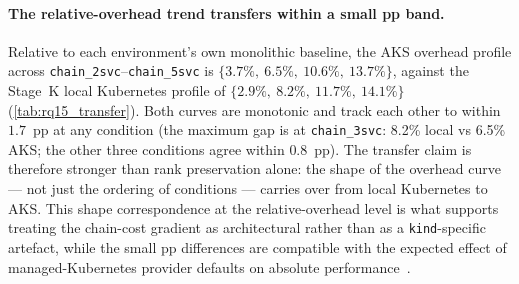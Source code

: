 \paragraph{The relative-overhead trend transfers within a small pp band.}
Relative to each environment's own monolithic baseline, the AKS overhead
profile across \texttt{chain\_2svc}--\texttt{chain\_5svc} is
$\{3.7\%,\ 6.5\%,\ 10.6\%,\ 13.7\%\}$, against the Stage~K local
Kubernetes profile of $\{2.9\%,\ 8.2\%,\ 11.7\%,\ 14.1\%\}$
(\cref{tab:rq15_transfer}). Both curves are monotonic and track each
other to within $1.7$~pp at any condition (the maximum gap is at
\texttt{chain\_3svc}: 8.2\% local vs 6.5\% AKS; the other three
conditions agree within $0.8$~pp). The transfer claim is therefore
stronger than rank preservation alone: the shape of the overhead curve
--- not just the ordering of conditions --- carries over from local
Kubernetes to AKS. This shape correspondence at the relative-overhead
level is what supports treating the chain-cost gradient as
architectural rather than as a \texttt{kind}-specific artefact, while
the small pp differences are compatible with the expected effect of
managed-Kubernetes provider defaults on absolute
performance~\cite{managed_k8s_perf}.

